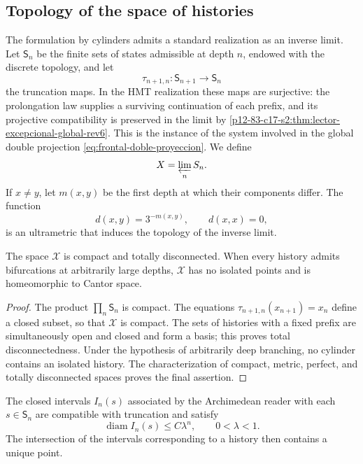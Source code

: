 \subsection{Topology of the space of histories}

The formulation by cylinders admits a standard realization as an
inverse limit. Let \(\mathsf S_n\) be the finite sets of states
admissible at depth \(n\), endowed with the discrete topology, and let
\[
 \tau_{n+1,n}:\mathsf S_{n+1}\longrightarrow\mathsf S_n
\]
the truncation maps. In the HMT realization these maps
are surjective: the prolongation law supplies a surviving continuation
of each prefix, and its projective compatibility is preserved in
the limit by
\cref{p12-83-c17-s2:thm:lector-excepcional-global-rev6}. This is the instance
of the system involved in the global double projection
\eqref{eq:frontal-doble-proyeccion}. We define
\[
 \mathcal X=\varprojlim_n\mathsf S_n.
\]
If \(x\ne y\), let \(m(x,y)\) be the first depth at which their components differ. The function
\[
 d(x,y)=3^{-m(x,y)},\qquad d(x,x)=0,
\]
is an ultrametric that induces the topology of the inverse limit.

\begin{theorem}
\label{p12-83-c17-s1:thm:compacto-historias}
\label{thm:compacto-historias}
The space \(\mathcal X\) is compact and totally disconnected. When
every history admits bifurcations at arbitrarily large depths,
\(\mathcal X\) has no isolated points and is homeomorphic to Cantor
space.
\end{theorem}

\begin{proof}
The product \(\prod_n\mathsf S_n\) is compact. The equations
\(\tau_{n+1,n}(x_{n+1})=x_n\) define a closed subset, so that
\(\mathcal X\) is compact. The sets of histories with a fixed prefix
are simultaneously open and closed and form a basis; this proves total
disconnectedness. Under the hypothesis of arbitrarily deep branching,
no cylinder contains an isolated history. The characterization of
compact, metric, perfect, and totally disconnected spaces proves
the final assertion.
\end{proof}

The closed intervals \(I_n(s)\) associated by the Archimedean reader with
each \(s\in\mathsf S_n\) are compatible with truncation and satisfy
\[
 \operatorname{diam}I_n(s)\leq C\lambda^n,
 \qquad 0<\lambda<1.
\]
The intersection of the intervals corresponding to a history then contains a unique point.

